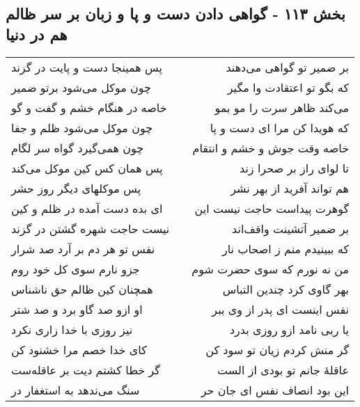 \begin{center}
\section*{بخش ۱۱۳ - گواهی دادن دست و پا و زبان بر سر  ظالم هم در دنیا}
\label{sec:sh113}
\begin{longtable}{l p{0.5cm} r}
پس همینجا دست و پایت در گزند
&&
بر ضمیر تو گواهی می‌دهند
\\
چون موکل می‌شود برتو ضمیر
&&
که بگو تو اعتقادت وا مگیر
\\
خاصه در هنگام خشم و گفت و گو
&&
می‌کند ظاهر سرت را مو بمو
\\
چون موکل می‌شود ظلم و جفا
&&
که هویدا کن مرا ای دست و پا
\\
چون همی‌گیرد گواه سر لگام
&&
خاصه وقت جوش و خشم و انتقام
\\
پس همان کس کین موکل می‌کند
&&
تا لوای راز بر صحرا زند
\\
پس موکلهای دیگر روز حشر
&&
هم تواند آفرید از بهر نشر
\\
ای بده دست آمده در ظلم و کین
&&
گوهرت پیداست حاجت نیست این
\\
نیست حاجت شهره گشتن در گزند
&&
بر ضمیر آتشینت واقف‌اند
\\
نفس تو هر دم بر آرد صد شرار
&&
که ببینیدم منم ز اصحاب نار
\\
جزو نارم سوی کل خود روم
&&
من نه نورم که سوی حضرت شوم
\\
همچنان کین ظالم حق ناشناس
&&
بهر گاوی کرد چندین التباس
\\
او ازو صد گاو برد و صد شتر
&&
نفس اینست ای پدر از وی ببر
\\
نیز روزی با خدا زاری نکرد
&&
یا ربی نامد ازو روزی بدرد
\\
کای خدا خصم مرا خشنود کن
&&
گر منش کردم زیان تو سود کن
\\
گر خطا کشتم دیت بر عاقله‌ست
&&
عاقلهٔ جانم تو بودی از الست
\\
سنگ می‌ندهد به استغفار در
&&
این بود انصاف نفس ای جان حر
\\
\end{longtable}
\end{center}
